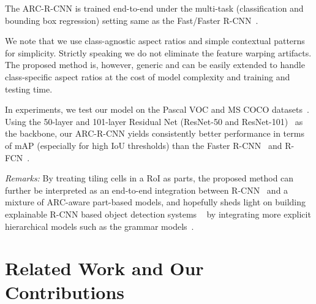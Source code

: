 \documentclass[10pt,twocolumn,letterpaper]{article}
\begin{document}
The ARC-R-CNN is trained end-to-end under the multi-task (classification and bounding box regression) setting same as the Fast/Faster R-CNN~\cite{fast_rcnn,faster_rcnn}. 


We note that we use class-agnostic aspect ratios and simple contextual patterns for simplicity. Strictly speaking we do not eliminate the feature warping artifacts. The proposed method is, however, generic and can be easily extended to handle class-specific aspect ratios at the cost of model complexity and training and testing time.

In experiments, we test our model on the Pascal VOC and MS COCO datasets~\cite{pascal}. Using the 50-layer and 101-layer Residual Net (ResNet-50 and ResNet-101)~\cite{resNet} as the backbone, our ARC-R-CNN yields consistently better performance in terms of mAP (especially for high IoU thresholds) than the Faster R-CNN~\cite{faster_rcnn} and R-FCN~\cite{rfcn}. 

\textit{Remarks:} By treating tiling cells in a RoI as parts, the proposed method can further be interpreted as an end-to-end integration between R-CNN~\cite{fast_rcnn,faster_rcnn} and a mixture of ARC-aware part-based models, and hopefully sheds light on building explainable R-CNN based object detection systems ~\cite{XAI} by integrating more explicit hierarchical models such as the grammar models~\cite{zhu_grammar,pff_grammar,carAOG,leozhu_nips07,DisAOT_CVPR2013}.

\vspace{-2mm}
\section{Related Work and Our Contributions}
 \vspace{-1mm}
\end{document}
